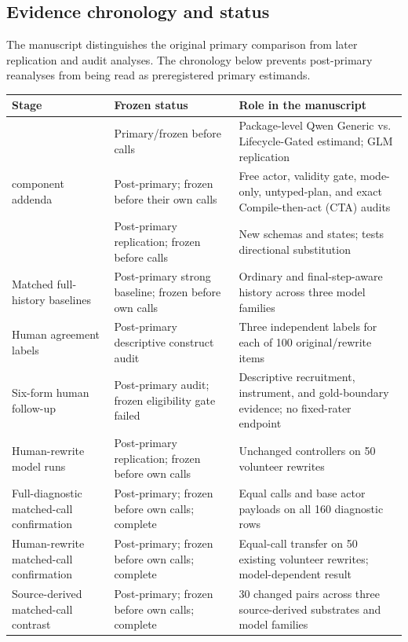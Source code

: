 \documentclass[10pt]{article}
\begin{document}
\subsection{Evidence chronology and status}
The manuscript distinguishes the original primary comparison from later replication and audit
analyses. The chronology below prevents post-primary reanalyses from being read as preregistered
primary estimands.

\begin{table}[H]
\centering
\small
\begin{tabular}{p{}p{}p{}}
\toprule
Stage & Frozen status & Role in the manuscript \\
\midrule
\PrimaryDiagnostic{} & Primary/frozen before calls & Package-level Qwen Generic vs. Lifecycle-Gated estimand; GLM replication \\
\PrimaryDiagnostic{} component addenda & Post-primary; frozen before their own calls & Free actor, validity gate, mode-only, untyped-plan, and exact Compile-then-act (CTA) audits \\
\NewSchemaReplication{} & Post-primary replication; frozen before calls & New schemas and states; tests directional substitution \\
Matched full-history baselines & Post-primary strong baseline; frozen before own calls & Ordinary and final-step-aware history across three model families \\
Human agreement labels & Post-primary descriptive construct audit & Three independent labels for each of 100 original/rewrite items \\
Six-form human follow-up & Post-primary audit; frozen eligibility gate failed & Descriptive recruitment, instrument, and gold-boundary evidence; no fixed-rater endpoint \\
Human-rewrite model runs & Post-primary replication; frozen before own calls & Unchanged controllers on 50 volunteer rewrites \\
Full-diagnostic matched-call confirmation & Post-primary; frozen before own calls; complete & Equal calls and base actor payloads on all 160 diagnostic rows \\
Human-rewrite matched-call confirmation & Post-primary; frozen before own calls; complete & Equal-call transfer on 50 existing volunteer rewrites; model-dependent result \\
Source-derived matched-call contrast & Post-primary; frozen before own calls; complete & 30 changed pairs across three source-derived substrates and model families \\

\end{tabular}
\end{table}
\end{document}
